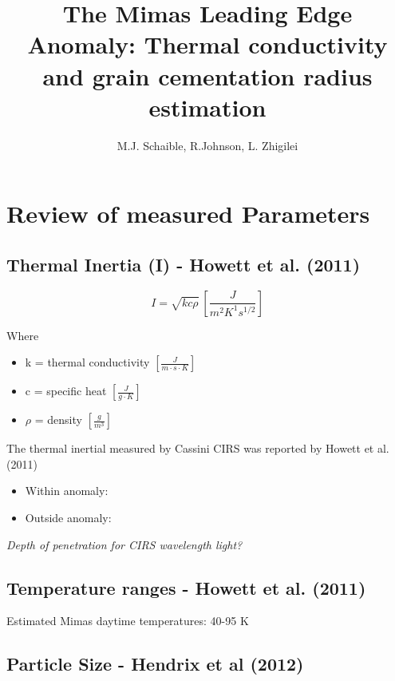 \documentclass[11pt]{article} %
\title{The Mimas Leading Edge Anomaly: Thermal conductivity and grain cementation radius estimation}
\author{M.J. Schaible, R.Johnson, L. Zhigilei}
\begin{document}
\maketitle

\section{Review of measured Parameters}
\label{sec:measured}

\subsection{Thermal Inertia (I) - Howett et al. (2011)}
\label{sec:inertia}

	\begin{equation}
	I = \sqrt{kc\rho} \: [\frac{J}{m^{2} K^{1} s^{1/2}}]
	\end{equation}

	\hspace{1cm}
	Where
	\begin{itemize}[leftmargin=3cm]
	\item k = thermal conductivity $[\frac{J}{m \cdot s \cdot K}]$
	\item c = specific heat $[\frac{J}{g \cdot K}]$
	\item $\rho$ = density $[\frac{g}{m^{3}}]$
	\end{itemize}

	The thermal inertial measured by Cassini CIRS was reported by Howett et al. (2011)
	\begin{itemize}
		\item Within anomaly: 
		\item Outside anomaly: 
	\end{itemize}
		
	\emph{Depth of penetration for CIRS wavelength light?}
	
\subsection{Temperature ranges - Howett et al. (2011)}
\label{sec:temperature}

	Estimated Mimas daytime temperatures: 40-95 K
	
\subsection{Particle Size - Hendrix et al (2012)}
\label{sec:size}
\end{document}
